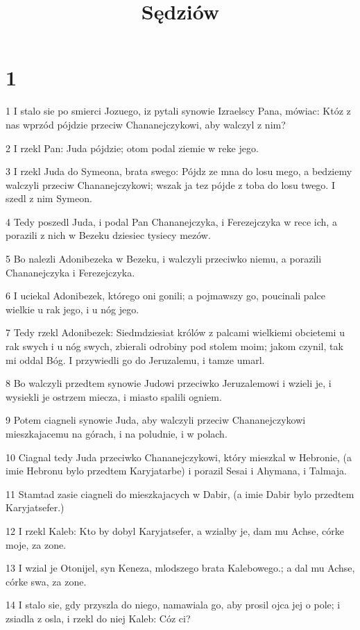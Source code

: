 

\title{Sędziów}


\chapter{1}

\par 1 I stalo sie po smierci Jozuego, iz pytali synowie Izraelscy Pana, mówiac: Któz z nas wprzód pójdzie przeciw Chananejczykowi, aby walczyl z nim?
\par 2 I rzekl Pan: Juda pójdzie; otom podal ziemie w reke jego.
\par 3 I rzekl Juda do Symeona, brata swego: Pójdz ze mna do losu mego, a bedziemy walczyli przeciw Chananejczykowi; wszak ja tez pójde z toba do losu twego. I szedl z nim Symeon.
\par 4 Tedy poszedl Juda, i podal Pan Chananejczyka, i Ferezejczyka w rece ich, a porazili z nich w Bezeku dziesiec tysiecy mezów.
\par 5 Bo nalezli Adonibezeka w Bezeku, i walczyli przeciwko niemu, a porazili Chananejczyka i Ferezejczyka.
\par 6 I uciekal Adonibezek, którego oni gonili; a pojmawszy go, poucinali palce wielkie u rak jego, i u nóg jego.
\par 7 Tedy rzekl Adonibezek: Siedmdziesiat królów z palcami wielkiemi obcietemi u rak swych i u nóg swych, zbierali odrobiny pod stolem moim; jakom czynil, tak mi oddal Bóg. I przywiedli go do Jeruzalemu, i tamze umarl.
\par 8 Bo walczyli przedtem synowie Judowi przeciwko Jeruzalemowi i wzieli je, i wysiekli je ostrzem miecza, i miasto spalili ogniem.
\par 9 Potem ciagneli synowie Juda, aby walczyli przeciw Chananejczykowi mieszkajacemu na górach, i na poludnie, i w polach.
\par 10 Ciagnal tedy Juda przeciwko Chananejczykowi, który mieszkal w Hebronie, (a imie Hebronu bylo przedtem Karyjatarbe) i porazil Sesai i Ahymana, i Talmaja.
\par 11 Stamtad zasie ciagneli do mieszkajacych w Dabir, (a imie Dabir bylo przedtem Karyjatsefer.)
\par 12 I rzekl Kaleb: Kto by dobyl Karyjatsefer, a wzialby je, dam mu Achse, córke moje, za zone.
\par 13 I wzial je Otonijel, syn Keneza, mlodszego brata Kalebowego.; a dal mu Achse, córke swa, za zone.
\par 14 I stalo sie, gdy przyszla do niego, namawiala go, aby prosil ojca jej o pole; i zsiadla z osla, i rzekl do niej Kaleb: Cóz ci?
